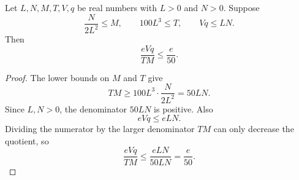 \begin{lemma}
Let \(L,N,M,T,V,q\) be real numbers with \(L>0\) and \(N>0\).  Suppose
\[
  \frac{N}{2L^2}\le M,\qquad 100L^3\le T,\qquad Vq\le LN .
\]
Then
\[
  \frac{eVq}{TM}\le \frac e{50}.
\]
\end{lemma}
\begin{proof}
The lower bounds on \(M\) and \(T\) give
\[
  TM\ge 100L^3\cdot \frac{N}{2L^2}=50LN .
\]
Since \(L,N>0\), the denominator \(50LN\) is positive.  Also
\[
  eVq\le eLN .
\]
Dividing the numerator by the larger denominator \(TM\) can only decrease
the quotient, so
\[
  \frac{eVq}{TM}\le \frac{eLN}{50LN}=\frac e{50}.
\]
\end{proof}
